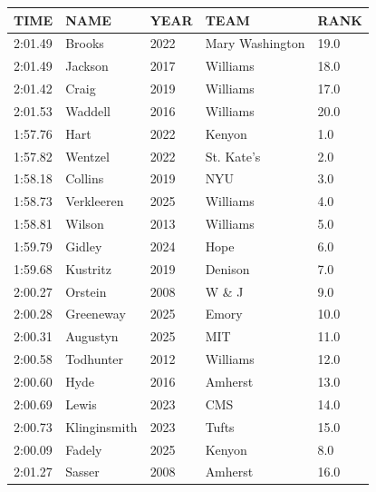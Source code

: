 \begin{table}[H]
\begin{minipage}[t]{0.48\textwidth}
\begin{tabular}{@{}p{1.8cm}p{2.8cm}p{1.2cm}p{1.4cm}p{0.8cm}@{}}
\hline
    \textbf{TIME} & \textbf{NAME} & \textbf{YEAR} & \textbf{TEAM} & \textbf{RANK} \\
\hline
    2:01.49 & Brooks & 2022 & Mary Washington & 19.0 \\
    2:01.49 & Jackson & 2017 & Williams & 18.0 \\
    2:01.42 & Craig & 2019 & Williams & 17.0 \\
    2:01.53 & Waddell & 2016 & Williams & 20.0 \\
    1:57.76 & Hart & 2022 & Kenyon & 1.0 \\
    1:57.82 & Wentzel & 2022 & St. Kate's & 2.0 \\
    1:58.18 & Collins & 2019 & NYU & 3.0 \\
    1:58.73 & Verkleeren & 2025 & Williams & 4.0 \\
    1:58.81 & Wilson & 2013 & Williams & 5.0 \\
    1:59.79 & Gidley & 2024 & Hope & 6.0 \\
    1:59.68 & Kustritz & 2019 & Denison & 7.0 \\
    2:00.27 & Orstein & 2008 & W \& J & 9.0 \\
    2:00.28 & Greeneway & 2025 & Emory & 10.0 \\
    2:00.31 & Augustyn & 2025 & MIT & 11.0 \\
    2:00.58 & Todhunter & 2012 & Williams & 12.0 \\
    2:00.60 & Hyde & 2016 & Amherst & 13.0 \\
    2:00.69 & Lewis & 2023 & CMS & 14.0 \\
    2:00.73 & Klinginsmith & 2023 & Tufts & 15.0 \\
    2:00.09 & Fadely & 2025 & Kenyon & 8.0 \\
    2:01.27 & Sasser & 2008 & Amherst & 16.0 \\
\hline
\end{tabular}
\end{minipage}
\end{table}

